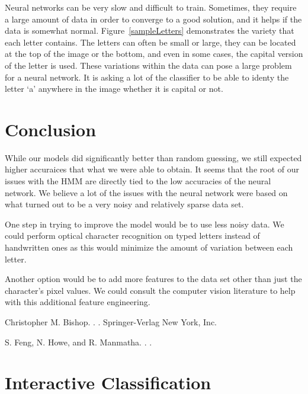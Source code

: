 \documentclass[11pt,letterpaper]{article}
\begin{document}
Neural networks can be very slow and difficult to train. Sometimes, they
require a large amount of data in order to converge to a good solution, and it
helps if the data is somewhat normal. Figure~\ref{sampleLetters} demonstrates the variety that
each letter contains. The letters can often be small or large, they can be
located at the top of the image or the bottom, and even in some cases, the
capital version of the letter is used. These variations within the data can
pose a large problem for a neural network. It is asking a lot of the classifier
to be able to identy the letter `a' anywhere in the image whether it is capital
or not.

\section{Conclusion}

While our models did significantly better than random guessing, we still expected higher accuraices
that what we were able to obtain. It seems that the root of our issues with the HMM are directly
tied to the low accuracies of the neural network. We believe a lot of the issues with the neural
network were based on what turned out to be a very noisy and relatively sparse data set. 

One step in trying to improve the model would be to use less noisy data. We could perform optical
character recognition on typed letters instead of handwritten ones as this would minimize the amount
of variation between each letter.

Another option would be to add more features to the data set other than just the character's pixel
values. We could consult the computer vision literature to help with this additional feature
engineering.


\begin{thebibliography}{}

\newblock Christopher M. Bishop.
.
.
\newblock Springer-Verlag New York, Inc.

\newblock S. Feng, N. Howe, and R. Manmatha.
.
.

\end{thebibliography}


\newpage
\appendix
\section{Interactive Classification}
\end{document}
